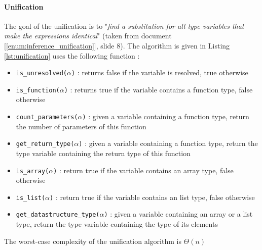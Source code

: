 \documentclass[a4paper,11pt]{article}
\begin{document}
\paragraph{Unification} The goal of the unification is to "\textit{find a substitution for all type variables that make the expressions identical}" (taken from document [\ref{enum:inference_unification}], slide 8). The algorithm is given in Listing \ref{lst:unification} uses the following function : 

\begin{itemize}
	\item \texttt{is\_unresolved($\alpha$)} : returns false if the variable is resolved, true otherwise 
	\item \texttt{is\_function($\alpha$)} : returns true if the variable contains a function type, false otherwise
	\item \texttt{count\_parameters($\alpha$)} : given a variable containing a function type, return the number of parameters of this function 
	\item \texttt{get\_return\_type($\alpha$)} : given a variable containing a function type, return the type variable containing the return type of this function
	\item \texttt{is\_array($\alpha$)} : return true if the variable contains an array type, false otherwise
	\item \texttt{is\_list($\alpha$)} : return true if the variable contains an list type, false otherwise 
	\item \texttt{get\_datastructure\_type($\alpha$)} : given a variable containing an array or a list type, return the type variable containing the type of its elements
\end{itemize}
The worst-case complexity of the unification algorithm is $\Theta(n)$
\end{document}
